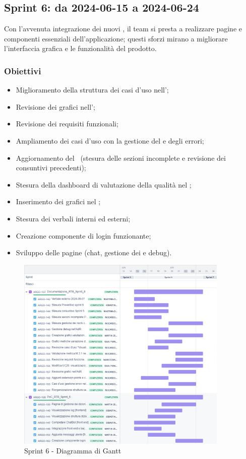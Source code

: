 \subsection{Sprint 6: da 2024-06-15 a 2024-06-24}
\par Con l'avvenuta integrazione dei nuovi , il team si presta a realizzare pagine e componenti essenziali dell'applicazione; questi sforzi mirano a migliorare l'interfaccia grafica e le funzionalità del prodotto.

\subsubsection{Obiettivi}
\begin{itemize}
  \item Miglioramento della struttura dei casi d'uso nell'\AdR;
  \item Revisione dei grafici nell'\AdR;
  \item Revisione dei requisiti funzionali;
  \item Ampliamento dei casi d'uso con la gestione del  e degli errori;
  \item Aggiornamento del \PdP\ (stesura delle sezioni incomplete e revisione dei consuntivi precedenti);
  \item Stesura della dashboard di valutazione della qualità nel \PdQ;
  \item Inserimento dei grafici nel \PdQ;
  \item Stesura dei verbali interni ed esterni;
  \item Creazione componente di login funzionante;
  \item Sviluppo delle pagine  (chat, gestione dei  e debug).
\end{itemize}

\begin{figure}[H]
  \centering
  \includegraphics[width=0.90\textwidth]{assets/Pianificazione/Sprint-6/gantt.png}
  \caption{Sprint 6 - Diagramma di Gantt}\label{fig:sprint-6-gantt}
\end{figure}
